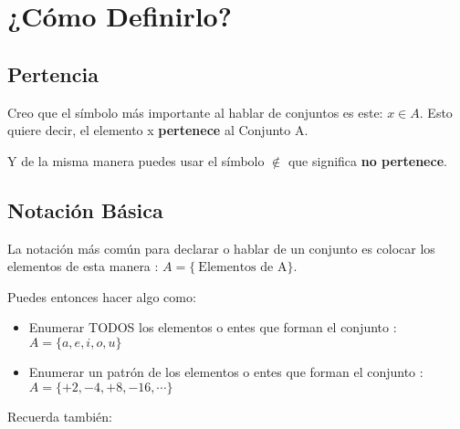 \documentclass[12pt]{report}                                    %
\begin{document}
            

        \clearpage
        \section{¿Cómo Definirlo?}


            \subsection{Pertencia}

            Creo que el símbolo más importante al hablar de conjuntos es este: $x \in A $. Esto quiere decir,
            el elemento x \textbf{pertenece} al Conjunto A.

            
            Y de la misma manera puedes usar el símbolo $\notin$ que significa \textbf{no pertenece}.


            \subsection{Notación Básica}

                La notación más común para declarar o hablar de un conjunto es colocar los elementos de esta
                manera : $ A = \{\ \text{Elementos de A} \}$.

                Puedes entonces hacer algo como:

                \begin{itemize}
                    \item Enumerar TODOS los elementos o entes que forman el conjunto :
                    \\$A = \{a, e, i, o, u\}$

                    \item Enumerar un patrón de los elementos o entes que forman el conjunto :
                    \\$A = \{+2, -4, +8, -16, \cdots \}$
                \end{itemize}


                Recuerda también:
\end{document}
